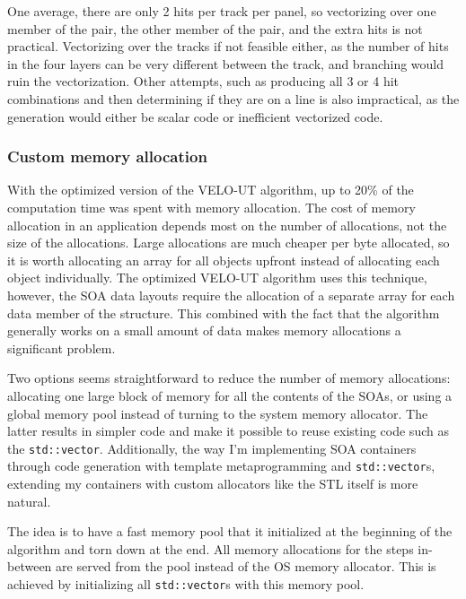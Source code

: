 \documentclass[12pt]{article}
\newcommand{\code}[1]{\texttt{#1}}
\begin{document}
One average, there are only 2 hits per track per panel, so vectorizing over one member of the pair, the other member of the pair, and the extra hits is not practical. Vectorizing over the tracks if not feasible either, as the number of hits in the four layers can be very different between the track, and branching would ruin the vectorization. Other attempts, such as producing all 3 or 4 hit combinations and then determining if they are on a line is also impractical, as the generation would either be scalar code or inefficient vectorized code.


\subsubsection{Custom memory allocation} \label{sec_velout_stack_alloc}

With the optimized version of the VELO-UT algorithm, up to 20\% of the computation time was spent with memory allocation. The cost of memory allocation in an application depends most on the number of allocations, not the size of the allocations. Large allocations are much cheaper per byte allocated, so it is worth allocating an array for all objects upfront instead of allocating each object individually. The optimized VELO-UT algorithm uses this technique, however, the SOA data layouts require the allocation of a separate array for each data member of the structure. This combined with the fact that the algorithm generally works on a small amount of data makes memory allocations a significant problem.

\vspace{1pc}

Two options seems straightforward to reduce the number of memory allocations: allocating one large block of memory for all the contents of the SOAs, or using a global memory pool instead of turning to the system memory allocator. The latter results in simpler code and make it possible to reuse existing code such as the \code{std::vector}. Additionally, the way I'm implementing SOA containers through code generation with template metaprogramming and \code{std::vector}s, extending my containers with custom allocators like the STL itself is more natural.

\vspace{1pc}

The idea is to have a fast memory pool that it initialized at the beginning of the algorithm and torn down at the end. All memory allocations for the steps in-between are served from the pool instead of the OS memory allocator. This is achieved by initializing all \code{std::vector}s with this memory pool.
\end{document}
